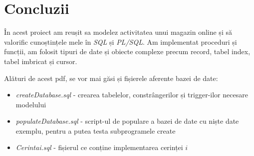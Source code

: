 \documentclass[12pt]{article}
\begin{document}
\pagebreak

\section{Concluzii}
În acest proiect am reușit sa modelez activitatea unui magazin online și să valorific cunoștințele mele în 
\textit{SQL} și \textit{PL/SQL}. Am implementat proceduri și funcții, am folosit tipuri de date și obiecte 
complexe precum record, tabel index, tabel imbricat și cursor.

Alături de acest pdf, se vor mai găsi și fișierele aferente bazei de date:

\begin{itemize}
  \item \textit{createDatabase.sql} - crearea tabelelor, constrângerilor și trigger-ilor necesare modelului
  \item \textit{populateDatabase.sql} - script-ul de populare a bazei de date cu niște date exemplu, pentru
        a putea testa subprogramele create
  \item \textit{Cerintai.sql} - fișierul ce conține implementarea cerinței $i$
\end{itemize}



\end{document}
